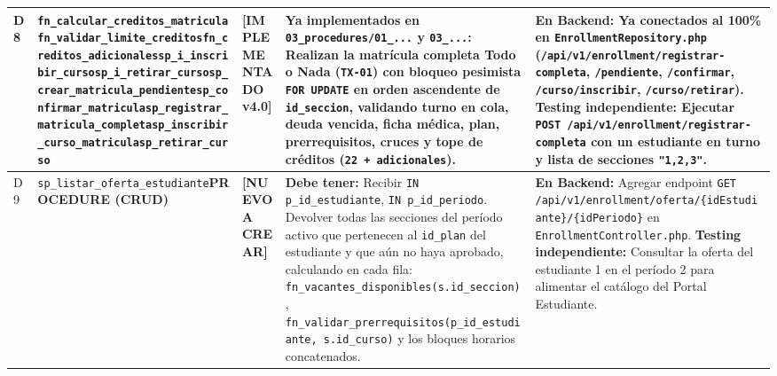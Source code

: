 \documentclass[10pt,a4paper,landscape]{article}
\newcommand{\stListo}{\textbf{\textcolor{teal!80!black}{[IMPLEMENTADO v4.0]}}}
\newcommand{\stNuevo}{\textbf{\textcolor{red!75!black}{[NUEVO A CREAR]}}}
\newcommand{\objProcCrud}{\textbf{\textcolor{unjbgBlue}{PROCEDURE (CRUD)}}}
\begin{document}
\begin{longtable}{|p{0.5cm}|p{3.8cm}|p{2.9cm}|p{8.8cm}|p{9.2cm}|}
\rowcolor{rowAlt}
D8 & \texttt{fn\_calcular\_creditos\_matricula}\newline \texttt{fn\_validar\_limite\_creditos}\newline \texttt{fn\_creditos\_adicionales}\newline \texttt{sp\_i\_inscribir\_curso}\newline \texttt{sp\_i\_retirar\_curso}\newline \texttt{sp\_crear\_matricula\_pendiente}\newline \texttt{sp\_confirmar\_matricula}\newline \texttt{sp\_registrar\_matricula\_completa}\newline \texttt{sp\_inscribir\_curso\_matricula}\newline \texttt{sp\_retirar\_curso} & \stListo & 
\textbf{Ya implementados en \texttt{03\_procedures/01\_...} y \texttt{03\_...}:}
Realizan la matrícula completa Todo o Nada (\texttt{TX-01}) con bloqueo pesimista \texttt{FOR UPDATE} en orden ascendente de \texttt{id\_seccion}, validando turno en cola, deuda vencida, ficha médica, plan, prerrequisitos, cruces y tope de créditos (\texttt{22 + adicionales}). & 
\textbf{En Backend:} Ya conectados al 100\% en \texttt{EnrollmentRepository.php} (\texttt{/api/v1/enrollment/registrar-completa}, \texttt{/pendiente}, \texttt{/confirmar}, \texttt{/curso/inscribir}, \texttt{/curso/retirar}).\newline
\textbf{Testing independiente:} Ejecutar \texttt{POST /api/v1/enrollment/registrar-completa} con un estudiante en turno y lista de secciones \texttt{"1,2,3"}. \\
\hline
D9 & \texttt{sp\_listar\_oferta\_estudiante}\newline \objProcCrud & \stNuevo & 
\textbf{Debe tener:}
Recibir \texttt{IN p\_id\_estudiante}, \texttt{IN p\_id\_periodo}. Devolver todas las secciones del período activo que pertenecen al \texttt{id\_plan} del estudiante y que aún no haya aprobado, calculando en cada fila: \texttt{fn\_vacantes\_disponibles(s.id\_seccion)}, \texttt{fn\_validar\_prerrequisitos(p\_id\_estudiante, s.id\_curso)} y los bloques horarios concatenados. & 
\textbf{En Backend:} Agregar endpoint \texttt{GET /api/v1/enrollment/oferta/\{idEstudiante\}/\{idPeriodo\}} en \texttt{EnrollmentController.php}.\newline
\textbf{Testing independiente:} Consultar la oferta del estudiante 1 en el período 2 para alimentar el catálogo del Portal Estudiante. \\
\hline

\end{longtable}
\normalsize
\end{document}
